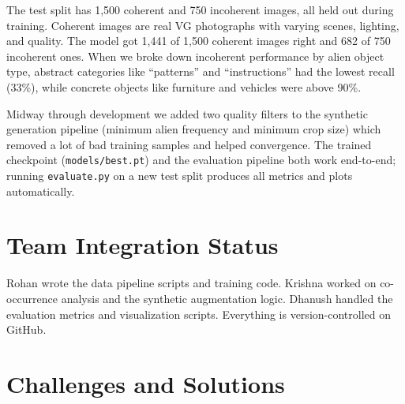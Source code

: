 \documentclass[10pt,a4paper]{article}
\begin{document}
\vspace{4pt}

The test split has 1,500 coherent and 750 incoherent images, all held out during training. Coherent images are real VG photographs with varying scenes, lighting, and quality. The model got 1,441 of 1,500 coherent images right and 682 of 750 incoherent ones. When we broke down incoherent performance by alien object type, abstract categories like ``patterns'' and ``instructions'' had the lowest recall (33\%), while concrete objects like furniture and vehicles were above 90\%.

Midway through development we added two quality filters to the synthetic generation pipeline (minimum alien frequency and minimum crop size) which removed a lot of bad training samples and helped convergence. The trained checkpoint (\texttt{models/best.pt}) and the evaluation pipeline both work end-to-end; running \texttt{evaluate.py} on a new test split produces all metrics and plots automatically.

\section{Team Integration Status}

Rohan wrote the data pipeline scripts and training code. Krishna worked on co-occurrence analysis and the synthetic augmentation logic. Dhanush handled the evaluation metrics and visualization scripts. Everything is version-controlled on GitHub.

\section{Challenges and Solutions}
\end{document}
